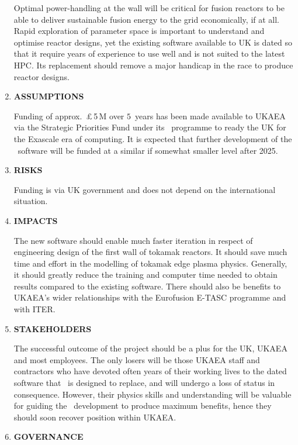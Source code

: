 \begin{enumerate}
Optimal power-handling at the wall will be critical for fusion reactors to be able to
deliver sustainable fusion energy to the grid economically, if at all.
Rapid exploration of parameter space is important to understand and optimise
reactor designs, yet the existing software available to UK is dated so that it
require years of experience to use well and is not suited to the latest HPC.
Its replacement should remove a major handicap in the race to produce reactor designs.
\item  {\bf ASSUMPTIONS} %

Funding of approx.\ $\pounds$\,5\,M over $5$~years has been made available to UKAEA via the Strategic
Priorities Fund under its \exc \ programme to ready the UK for the Exascale era of computing.
It is expected that further development of the \nep \ software will be funded at a similar if
somewhat smaller level after 2025.
\item  {\bf RISKS} %

Funding is via UK government and does not depend on the international situation.
\item  {\bf IMPACTS} %

The new software should enable much faster iteration in respect of engineering design of the first wall
of tokamak reactors. It should save much time and effort in the modelling of
tokamak edge plasma physics. Generally, it should greatly reduce the training and computer time
needed to obtain results compared to the existing software. There should also be benefits to
UKAEA's wider relationships with the Eurofusion E-TASC programme and with ITER.
\item  {\bf STAKEHOLDERS} %

The successful outcome of the project should be a plus for the UK, UKAEA and most employees.
The only losers will be those UKAEA staff and contractors who have devoted often years of
their working lives to the dated software that \nep \ is
designed to replace, and will undergo a loss of status in consequence. However, their physics skills
and understanding will be valuable for guiding the \nep\ development to produce maximum
benefits, hence they should soon recover position within UKAEA.
\item  {\bf GOVERNANCE} %


\end{enumerate}
